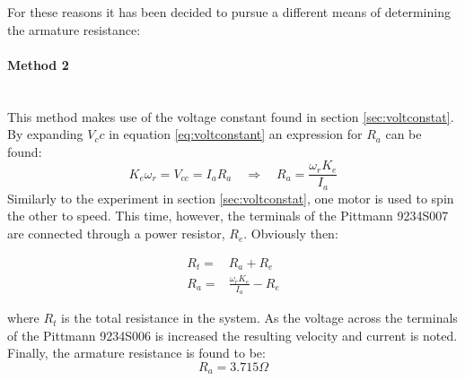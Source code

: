 For these reasons it has been decided to pursue a different means of determining the armature resistance:
\paragraph{Method 2}~\\
This method makes use of the voltage constant found in section \ref{sec:voltconstat}.
By expanding $V_cc$ in equation \ref{eq:voltconstant} an expression for $R_a$ can be found:
\begin{equation}
	\label{eq:voltconstantexpanded}
	K_e\omega_r = V_{cc} = I_aR_a\quad \Rightarrow \quad R_a = \frac{\omega_rK_e}{I_a}
\end{equation}
Similarly to the experiment in section \ref{sec:voltconstat}, one motor is used to spin the other to speed.
This time, however, the terminals of the Pittmann 9234S007 are connected through a power resistor, $R_e$.
Obviously then:

\begin{eqnarray}
	R_t =& R_a + R_e\\
	R_a =& \frac{\omega_rK_e}{I_a}-R_e
\end{eqnarray}

where $R_t$ is the total resistance in the system.
As the voltage across the terminals of the Pittmann 9234S006 is increased the resulting velocity and current is noted.
Finally, the armature resistance is found to be:
$$R_a = 3.715\Omega$$
